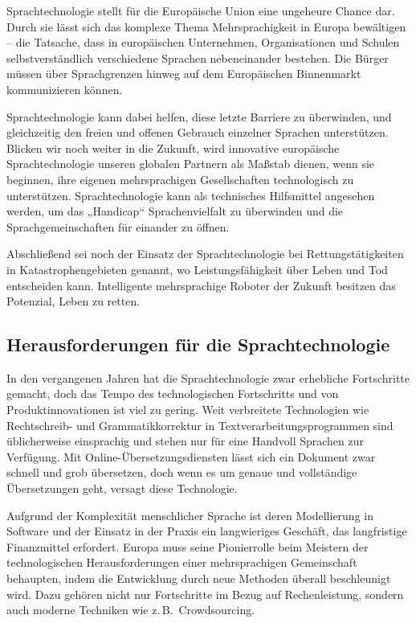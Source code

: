 \documentclass[]{../../metanetpaper}
\begin{document}
\begin{multicols}{2}

Sprachtechnologie stellt für die Europäische Union eine ungeheure Chance dar. Durch sie lässt sich das komplexe Thema Mehrsprachigkeit in Europa bewältigen -- die Tatsache, dass in europäischen Unternehmen, Organisationen und Schulen selbstverständlich verschiedene Sprachen nebeneinander bestehen. Die Bürger müssen über Sprachgrenzen hinweg auf dem Europäischen Binnenmarkt kommunizieren können.

Sprachtechnologie kann dabei helfen, diese letzte Barriere zu überwinden, und gleichzeitig den freien und offenen Gebrauch einzelner Sprachen unterstützen. Blicken wir noch weiter in die Zukunft, wird innovative europäische Sprachtechnologie unseren globalen Partnern als Maßstab dienen, wenn sie beginnen, ihre eigenen mehrsprachigen Gesellschaften technologisch zu unterstützen. Sprachtechnologie kann als technisches Hilfsmittel angesehen werden, um das „Handicap“ Sprachenvielfalt zu überwinden und die Sprachgemeinschaften für einander zu öffnen.

Abschließend sei noch der Einsatz der Sprachtechnologie bei Rettungstätigkeiten in Katastrophengebieten genannt, wo Leistungsfähigkeit über Leben und Tod entscheiden kann. Intelligente mehrsprachige Roboter der Zukunft besitzen das Potenzial, Leben zu retten.

\subsection{Herausforderungen für die Sprachtechnologie}

In den vergangenen Jahren hat die Sprachtechnologie zwar erhebliche Fortschritte gemacht, doch das Tempo des technologischen Fortschritts und von Produktinnovationen ist viel zu gering. Weit verbreitete Technologien wie Rechtschreib- und Grammatikkorrektur in Textverarbeitungsprogrammen sind üblicherweise einsprachig und stehen nur für eine Handvoll Sprachen zur Verfügung. Mit On\-line-Über\-set\-zungs\-diensten lässt sich ein Dokument zwar schnell und grob übersetzen, doch wenn es um genaue und vollständige Übersetzungen geht, versagt diese Technologie.


Aufgrund der Komplexität menschlicher Sprache ist deren Modellierung in Software und der Einsatz in der Praxis ein langwieriges Geschäft, das langfristige Finanzmittel erfordert. Europa muss seine Pionierrolle beim Meistern der technologischen Herausforderungen einer mehrsprachigen Gemeinschaft behaupten, indem die Entwicklung durch neue Methoden überall beschleunigt wird. Dazu gehören nicht nur Fortschritte im Bezug auf Rechenleistung, sondern auch moderne Techniken wie z.\,B.~Crowdsourcing.


\end{multicols}
\end{document}
